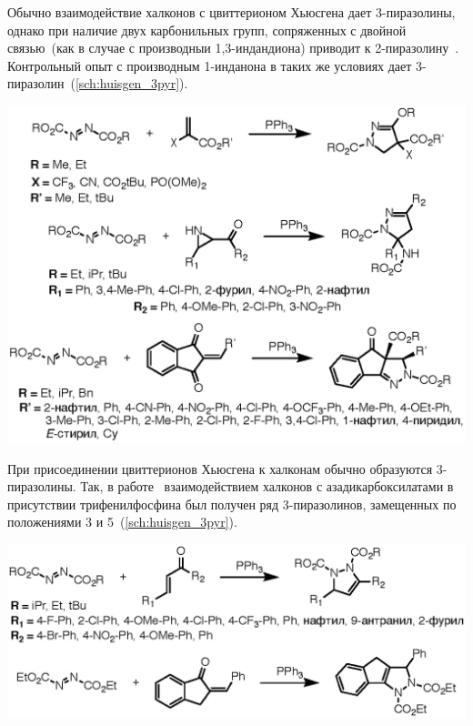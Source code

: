 Обычно взаимодействие халконов с цвиттерионом Хьюсгена дает 3-пиразолины, однако при наличие двух карбонильных групп, сопряженных с двойной связью~(как в случае с производныи 1,3-индандиона) приводит к 2-пиразолину~\cite{Li2017a}.
Контрольный опыт с производным 1-инданона в таких же условиях дает 3-пиразолин~(\ref{sch:huisgen_3pyr}).

\begin{scheme}
    \centering
    \includegraphics{sections/literature/img/huisgen_2pyr.eps}
    \caption{}
    \label{sch:huisgen_2pyr}
\end{scheme}

При присоединении цвиттерионов Хьюсгена к халконам обычно образуются 3-пиразолины.
Так, в работе~\cite{Nair2007} взаимодействием халконов с азадикарбоксилатами в присутствии трифенилфосфина был получен ряд 3-пиразолинов, замещенных по положениями 3 и 5~(\ref{sch:huisgen_3pyr}).

\begin{scheme}[h!]
    \centering
    \includegraphics{sections/literature/img/huisgen_3pyr.eps}
    \caption{}
    \label{sch:huisgen_3pyr}
\end{scheme}

